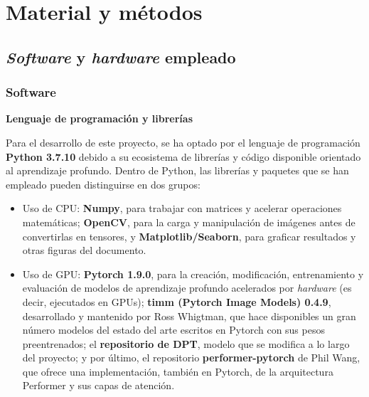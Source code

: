 \section{Material y métodos}

\subsection{\textit{Software} y \textit{hardware} empleado}

\subsubsection{Software}


\textbf{Lenguaje de programación y librerías}

Para el desarrollo de este proyecto, se ha optado por el lenguaje de programación \textbf{Python 3.7.10} debido a su ecosistema de librerías y código disponible orientado al aprendizaje profundo. Dentro de Python, las librerías y paquetes que se han empleado pueden distinguirse en dos grupos: 
\begin{itemize}
\item Uso de CPU: \textbf{Numpy}, para trabajar con matrices y acelerar operaciones matemáticas; \textbf{OpenCV}, para la carga y manipulación de imágenes antes de convertirlas en tensores, y \textbf{Matplotlib/Seaborn}, para graficar resultados y otras figuras del documento.
\item Uso de GPU: \textbf{Pytorch 1.9.0}, para la creación, modificación, entrenamiento y evaluación de modelos de aprendizaje profundo acelerados por \textit{hardware} (es decir, ejecutados en GPUs); \textbf{timm (Pytorch Image Models) 0.4.9}, desarrollado y mantenido por Ross Whigtman, que hace disponibles un gran número modelos del estado del arte escritos en Pytorch con sus pesos preentrenados; el \textbf{repositorio de DPT}, modelo que se modifica a lo largo del proyecto; y por último, el repositorio \textbf{performer-pytorch} de Phil Wang, que ofrece una implementación, también en Pytorch, de la arquitectura Performer y sus capas de atención.
\end{itemize}


